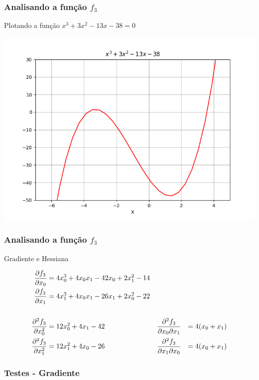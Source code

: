 \documentclass{beamer}
\begin{document}
\begin{frame}
\frametitle{Analisando a função $f_3$}

Plotando a função $x^3 + 3x^2 - 13x - 38 = 0$

\begin{center}
	\includegraphics[scale=0.5]{fig3.png}
\end{center}

\end{frame}

\begin{frame}
\frametitle{Analisando a função $f_3$}

Gradiente e Hessiana

\begin{align*}
	\frac{\partial f_3}{\partial x_0} &= 4 x_0^3 + 4 x_0 x_1 - 42 x_0 + 2 x_1^2 - 14 \\
	\frac{\partial f_3}{\partial x_1} &= 4 x_1^3 + 4 x_0 x_1 - 26 x_1 + 2 x_0^2 - 22 \\
	\vspace{1in} \\
	\frac{\partial^2 f_3}{\partial x_0^2} &= 12 x_0^2 + 4 x_1 - 42 && \frac{\partial^2 f_3}{\partial x_0 \partial x_1} &= 4(x_0 + x_1) \\
	\frac{\partial^2 f_3}{\partial x_1^2} &= 12 x_1^2 + 4 x_0 - 26 && \frac{\partial^2 f_3}{\partial x_1 \partial x_0} &= 4(x_0 + x_1)
\end{align*}

\end{frame}

\begin{frame}
\frametitle{Testes - Gradiente}

\end{frame}
\end{document}

